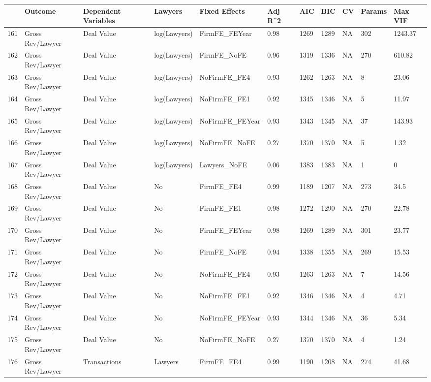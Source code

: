 \documentclass{article}
\begin{document}
\begin{table}[H]
\centering
\begin{tabular}{rllllllllll}
  \hline
 & Outcome & Dependent Variables & Lawyers & Fixed Effects & Adj R^2 & AIC & BIC & CV & Params & Max VIF \\ 
  \hline
161 & Gross Rev/Lawyer & Deal Value & log(Lawyers) & FirmFE\_FEYear & 0.98 & 1269 & 1289 & NA & 302 & 1243.37 \\ 
  162 & Gross Rev/Lawyer & Deal Value & log(Lawyers) & FirmFE\_NoFE & 0.96 & 1319 & 1336 & NA & 270 & 610.82 \\ 
  163 & Gross Rev/Lawyer & Deal Value & log(Lawyers) & NoFirmFE\_FE4 & 0.93 & 1262 & 1263 & NA & 8 & 23.06 \\ 
  164 & Gross Rev/Lawyer & Deal Value & log(Lawyers) & NoFirmFE\_FE1 & 0.92 & 1345 & 1346 & NA & 5 & 11.97 \\ 
  165 & Gross Rev/Lawyer & Deal Value & log(Lawyers) & NoFirmFE\_FEYear & 0.93 & 1343 & 1345 & NA & 37 & 143.93 \\ 
  166 & Gross Rev/Lawyer & Deal Value & log(Lawyers) & NoFirmFE\_NoFE & 0.27 & 1370 & 1370 & NA & 5 & 1.32 \\ 
  167 & Gross Rev/Lawyer & Deal Value & log(Lawyers) & Lawyers\_NoFE & 0.06 & 1383 & 1383 & NA & 1 & 0 \\ 
  168 & Gross Rev/Lawyer & Deal Value & No & FirmFE\_FE4 & 0.99 & 1189 & 1207 & NA & 273 & 34.5 \\ 
  169 & Gross Rev/Lawyer & Deal Value & No & FirmFE\_FE1 & 0.98 & 1272 & 1290 & NA & 270 & 22.78 \\ 
  170 & Gross Rev/Lawyer & Deal Value & No & FirmFE\_FEYear & 0.98 & 1269 & 1289 & NA & 301 & 23.77 \\ 
  171 & Gross Rev/Lawyer & Deal Value & No & FirmFE\_NoFE & 0.94 & 1338 & 1355 & NA & 269 & 15.53 \\ 
  172 & Gross Rev/Lawyer & Deal Value & No & NoFirmFE\_FE4 & 0.93 & 1263 & 1263 & NA & 7 & 14.56 \\ 
  173 & Gross Rev/Lawyer & Deal Value & No & NoFirmFE\_FE1 & 0.92 & 1346 & 1346 & NA & 4 & 4.71 \\ 
  174 & Gross Rev/Lawyer & Deal Value & No & NoFirmFE\_FEYear & 0.93 & 1344 & 1346 & NA & 36 & 5.34 \\ 
  175 & Gross Rev/Lawyer & Deal Value & No & NoFirmFE\_NoFE & 0.27 & 1370 & 1370 & NA & 4 & 1.24 \\ 
  176 & Gross Rev/Lawyer & Transactions & Lawyers & FirmFE\_FE4 & 0.99 & 1190 & 1208 & NA & 274 & 41.68 \\ 

\end{tabular}
\end{table}
\end{document}
